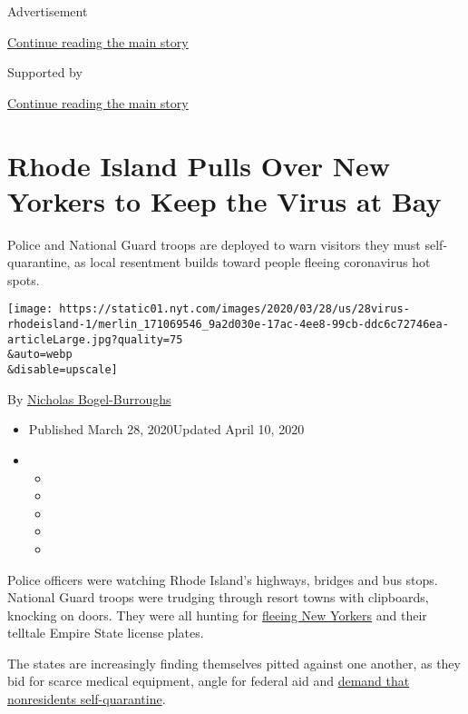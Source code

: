 Advertisement

\protect\hyperlink{after-top}{Continue reading the main story}

Supported by

\protect\hyperlink{after-sponsor}{Continue reading the main story}

\hypertarget{rhode-island-pulls-over-new-yorkers-to-keep-the-virus-at-bay}{%
\section{Rhode Island Pulls Over New Yorkers to Keep the Virus at
Bay}\label{rhode-island-pulls-over-new-yorkers-to-keep-the-virus-at-bay}}

Police and National Guard troops are deployed to warn visitors they must
self-quarantine, as local resentment builds toward people fleeing
coronavirus hot spots.

\texttt{[image: https://static01.nyt.com/images/2020/03/28/us/28virus-rhodeisland-1/merlin\_171069546\_9a2d030e-17ac-4ee8-99cb-ddc6c72746ea-articleLarge.jpg?quality=75\\\&auto=webp\\\&disable=upscale]}

By \href{https://www.nytimes.com/by/nicholas-bogel-burroughs}{Nicholas
Bogel-Burroughs}

\begin{itemize}
\item
  Published March 28, 2020Updated April 10, 2020
\item
  \begin{itemize}
  \item
  \item
  \item
  \item
  \item
  \end{itemize}
\end{itemize}

Police officers were watching Rhode Island's highways, bridges and bus
stops. National Guard troops were trudging through resort towns with
clipboards, knocking on doors. They were all hunting for
\href{https://www.nytimes.com/2020/04/10/nyregion/coronavirus-second-homes-travel.html}{fleeing
New Yorkers} and their telltale Empire State license plates.

The states are increasingly finding themselves pitted against one
another, as they bid for scarce medical equipment, angle for federal aid
and
\href{https://www.nytimes.com/2020/03/25/us/coronavirus-united-states.html}{demand
that nonresidents self-quarantine}.

